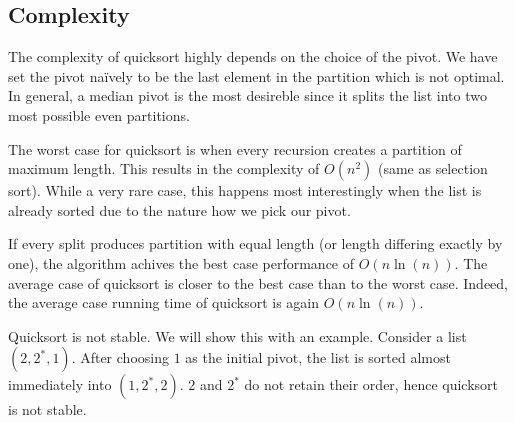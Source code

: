 

\subsection{Complexity}


The complexity of quicksort highly depends on the choice of the pivot. We have set the pivot naïvely to be the last element in the partition which is not optimal. In general, a median pivot is the most desireble since it splits the list into two most possible even partitions.

The worst case for quicksort is when every recursion creates a partition of maximum length. This results in the complexity of \(O(n^2)\) (same as selection sort). While a very rare case, this happens most interestingly when the list is already sorted due to the nature how we pick our pivot.\cite[p.~137]{bib:thealgorithmdesignmanual}

If every split produces partition with equal length (or length differing exactly by one), the algorithm achives the best case performance of \(O(n \ln(n))\). The average case of quicksort is closer to the best case than to the worst case. Indeed, the average case running time of quicksort is again \(O(n \ln(n))\).\cite[p.~150]{bib:introductiontoalgorithms}

Quicksort is not stable. We will show this with an example. Consider a list \((2, 2^{*}, 1)\). After choosing \(1\) as the initial pivot, the list is sorted almost immediately into \((1, 2^{*}, 2)\). \(2\) and \(2^{*}\) do not retain their order, hence quicksort is not stable.